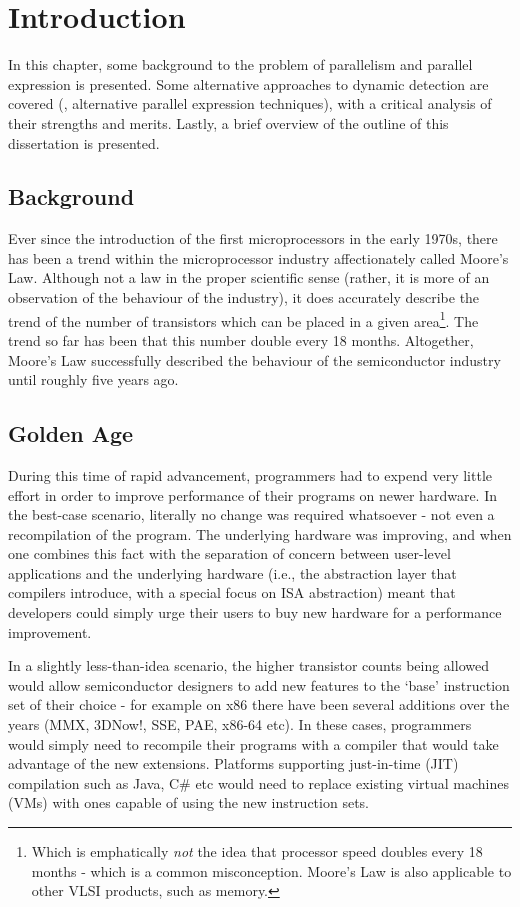\chapter{Introduction} \label{chp:introduction}
In this chapter, some background to the problem of parallelism and parallel expression is presented. Some alternative approaches to dynamic detection are covered (\ie, alternative parallel expression techniques), with a critical analysis of their strengths and merits. Lastly, a brief overview of the outline of this dissertation is presented.

\section{Background} \label{sec:introduction/background}
Ever since the introduction of the first microprocessors in the early 1970s, there has been a trend within the microprocessor industry affectionately called Moore's Law. Although not a law in the proper scientific sense (rather, it is more of an observation of the behaviour of the industry), it does accurately describe the trend of the number of transistors which can be placed in a given area\footnote{Which is emphatically \textit{not} the idea that processor speed doubles every 18 months - which is a common misconception. Moore's Law is also applicable to other VLSI products, such as memory.}. The trend so far has been that this number double every 18 months. Altogether, Moore's Law successfully described the behaviour of the semiconductor industry until roughly five years ago.

\section{Golden Age} \label{sec:introduction/golden-age}
During this time of rapid advancement, programmers had to expend very little effort in order to improve performance of their programs on newer hardware. In the best-case scenario, literally no change was required whatsoever - not even a recompilation of the program. The underlying hardware was improving, and when one combines this fact with the separation of concern between user-level applications and the underlying hardware (i.e., the abstraction layer that compilers introduce, with a special focus on ISA abstraction) meant that developers could simply urge their users to buy new hardware for a performance improvement.

In a slightly less-than-idea scenario, the higher transistor counts being allowed would allow semiconductor designers to add new features to the `base' instruction set of their choice - for example on x86 there have been several additions over the years (MMX, 3DNow!, SSE, PAE, x86-64 etc). In these cases, programmers would simply need to recompile their programs with a compiler that would take advantage of the new extensions. Platforms supporting just-in-time (JIT) compilation such as Java, C\# etc would need to replace existing virtual machines (VMs) with ones capable of using the new instruction sets.

